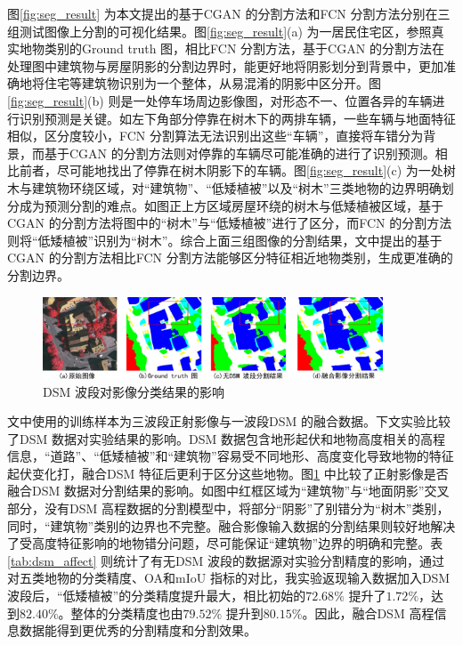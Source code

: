 图\ref{fig:seg_result} 为本文提出的基于CGAN 的分割方法和FCN 分割方法分别在三组测试图像上分割的可视化结果。图\ref{fig:seg_result}(a) 为一居民住宅区，参照真实地物类别的Ground truth 图，相比FCN 分割方法，基于CGAN 的分割方法在处理图中建筑物与房屋阴影的分割边界时，能更好地将阴影划分到背景中，更加准确地将住宅等建筑物识别为一个整体，从易混淆的阴影中区分开。图\ref{fig:seg_result}(b) 则是一处停车场周边影像图，对形态不一、位置各异的车辆进行识别预测是关键。如左下角部分停靠在树木下的两排车辆，一些车辆与地面特征相似，区分度较小，FCN 分割算法无法识别出这些“车辆”，直接将车错分为背景，而基于CGAN 的分割方法则对停靠的车辆尽可能准确的进行了识别预测。相比前者，尽可能地找出了停靠在树木阴影下的车辆。图\ref{fig:seg_result}(c) 为一处树木与建筑物环绕区域，对“建筑物”、“低矮植被”以及“树木”三类地物的边界明确划分成为预测分割的难点。如图正上方区域房屋环绕的树木与低矮植被区域，基于CGAN 的分割方法将图中的“树木”与“低矮植被”进行了区分，而FCN 的分割方法则将“低矮植被”识别为“树木”。综合上面三组图像的分割结果，文中提出的基于CGAN 的分割方法相比FCN 分割方法能够区分特征相近地物类别，生成更准确的分割边界。

\begin{figure}[htb]
  \centering
  \includegraphics[width=0.9\textwidth]{figures/dsm_affect}
  \caption{DSM 波段对影像分类结果的影响}\label{fig:dsm_affect}
\end{figure}

文中使用的训练样本为三波段正射影像与一波段DSM 的融合数据。下文实验比较了DSM 数据对实验结果的影响。DSM 数据包含地形起伏和地物高度相关的高程信息，“道路”、“低矮植被”和“建筑物”容易受不同地形、高度变化导致地物的特征起伏变化打，融合DSM 特征后更利于区分这些地物。图\ref{fig:dsm_affect} 中比较了正射影像是否融合DSM 数据对分割结果的影响。如图中红框区域为“建筑物”与“地面阴影”交叉部分，没有DSM 高程数据的分割模型中，将部分“阴影”了别错分为“树木”类别，同时，“建筑物”类别的边界也不完整。融合影像输入数据的分割结果则较好地解决了受高度特征影响的地物错分问题，尽可能保证“建筑物”边界的明确和完整。表\ref{tab:dsm_affect} 则统计了有无DSM 波段的数据源对实验分割精度的影响，通过对五类地物的分类精度、OA和mIoU 指标的对比，我实验返现输入数据加入DSM 波段后，“低矮植被”的分类精度提升最大，相比初始的$72.68\%$ 提升了$1.72\%$，达到$82.40\%$。整体的分类精度也由$79.52\%$ 提升到$80.15\%$。因此，融合DSM 高程信息数据能得到更优秀的分割精度和分割效果。

